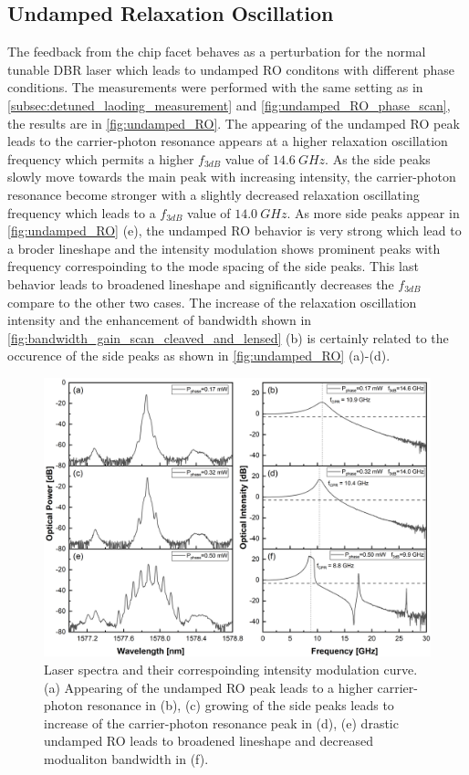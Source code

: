\subsection{Undamped Relaxation Oscillation}\label{subsec:undamped_RO_measurement}
The feedback from the chip facet behaves as a perturbation for the normal tunable DBR laser which leads to undamped RO conditons with different phase conditions. The measurements were performed with the same setting as in \autoref{subsec:detuned_laoding_measurement} and \autoref{fig:undamped_RO_phase_scan}, the results are in \autoref{fig:undamped_RO}. The appearing of the undamped RO peak leads to the carrier-photon resonance appears at a higher relaxation oscillation frequency which permits a higher $f_{3dB}$ value of $14.6 \ GHz$. As the side peaks slowly move towards the main peak with increasing intensity, the carrier-photon resonance become stronger with a slightly decreased relaxation oscillating frequency which leads to a $f_{3dB}$ value of $14.0 \ GHz$. As more side peaks appear in \autoref{fig:undamped_RO} (e), the undamped RO behavior is very strong which lead to a broder lineshape and the intensity modulation shows prominent peaks with frequency correspoinding to the mode spacing of the side peaks. This last behavior leads to broadened lineshape and significantly decreases the $f_{3dB}$ compare to the other two cases. The increase of the relaxation oscillation intensity and the enhancement of bandwidth shown in \autoref{fig:bandwidth_gain_scan_cleaved_and_lensed} (b) is certainly related to the occurence of the side peaks as shown in \autoref{fig:undamped_RO} (a)-(d).

\begin{figure}[ht]
    \centering
    \includegraphics[width=\linewidth]{figures/Umdamped_RO_and_bandwidth_grating_4621.png}
    \caption{Laser spectra and their correspoinding intensity modulation curve. (a) Appearing of the undamped RO peak leads to a higher carrier-photon resonance in (b), (c) growing of the side peaks leads to increase of the carrier-photon resonance peak in (d), (e) drastic undamped RO leads to broadened lineshape and decreased modualiton bandwidth in (f).}
    \label{fig:undamped_RO}
\end{figure}

